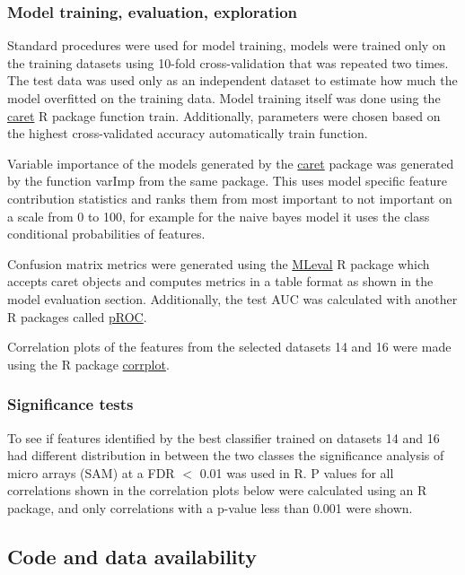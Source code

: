 \subsubsection{Model training, evaluation, exploration}

Standard procedures were used for model training, models were trained only on the training datasets using 10-fold cross-validation that was repeated two times.
The test data was used only as an independent dataset to estimate how much the model overfitted on the training data.
Model training itself was done using the \href{https://topepo.github.io/caret/}{caret} R package function train.
Additionally, parameters were chosen based on the highest cross-validated accuracy automatically train function.

Variable importance of the models generated by the \href{https://topepo.github.io/caret/}{caret} package was generated by the function varImp from the same package.
This uses model specific feature contribution statistics and ranks them from most important to not important on a scale from 0 to 100, for example for the naive bayes model it uses the class conditional probabilities of features.

Confusion matrix metrics were generated using the \href{https://cran.r-project.org/web/packages/MLeval/index.html}{MLeval} R package which accepts caret objects and computes metrics in a table format as shown in the model evaluation section.
Additionally, the test AUC was calculated with another R packages called \href{https://cran.r-project.org/web/packages/pROC/pROC.pdf}{pROC}.

Correlation plots of the features from the selected datasets 14 and 16 were made using the R package \href{https://cran.r-project.org/web/packages/corrplot/vignettes/corrplot-intro.html}{corrplot}.

\subsubsection{Significance tests}

To see if features identified by the best classifier trained on datasets 14 and 16 had different distribution in between the two classes the significance analysis of micro arrays (SAM) at a FDR \(<\) 0.01 was used in R.
P values for all correlations shown in the correlation plots below were calculated using an R package, and only correlations with a p-value less than 0.001 were shown.

\subsection{Code and data availability}\label{sec:github}


